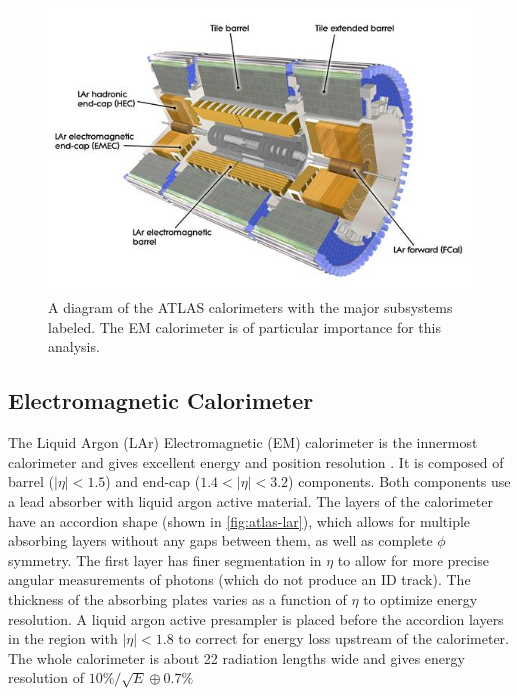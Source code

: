 \begin{figure}[!h]
\centering
\includegraphics[width=.7\textwidth]{figures/Detector/atlas-calorimeters.jpg}
\caption{A diagram of the \ac{ATLAS} calorimeters with the major subsystems labeled. The \ac{EM} calorimeter is of particular importance for this analysis. \cite{calorimeters}}
\label{fig:atlas-calos}
\end{figure}


\subsection{Electromagnetic Calorimeter}

The Liquid Argon (LAr) Electromagnetic (EM) calorimeter is the innermost calorimeter and gives excellent energy and position resolution \cite{calorimeters}. It is composed of barrel ($|\eta| < 1.5$) and end-cap ($1.4 < |\eta| < 3.2$) components. Both components use a lead absorber with liquid argon active material. The layers of the calorimeter have an accordion shape (shown in \autoref{fig:atlas-lar}), which allows for multiple absorbing layers without any gaps between them, as well as complete $\phi$ symmetry. The first layer has finer segmentation in $\eta$ to allow for more precise angular measurements of photons (which do not produce an \ac{ID} track). The thickness of the absorbing plates varies as a function of $\eta$ to optimize energy resolution. A liquid argon active presampler is placed before the accordion layers in the region with $|\eta| < 1.8$ to correct for energy loss upstream of the calorimeter. The whole calorimeter is about 22 radiation lengths wide and gives energy resolution of $10\%/\sqrt{E} \oplus 0.7\%$


